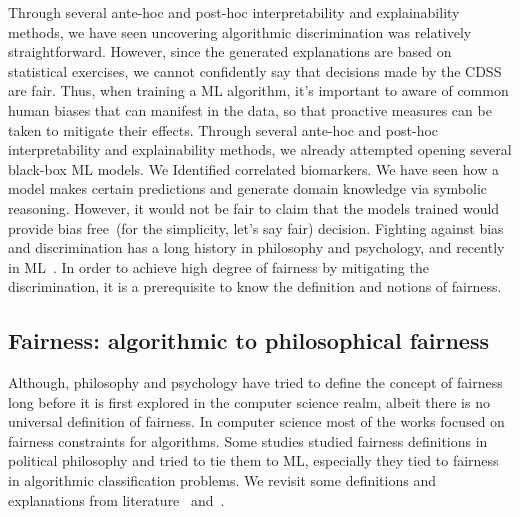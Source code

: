 \hspace*{3.5mm} Through several ante-hoc and post-hoc interpretability and explainability methods, we have seen uncovering algorithmic discrimination was relatively straightforward. However, since the generated explanations are based on statistical exercises, we cannot confidently say that decisions made by the CDSS are fair. Thus, when training a ML algorithm, it's important to aware of common human biases that can manifest in the data, so that proactive measures can be taken to mitigate their effects. %
Through several ante-hoc and post-hoc interpretability and explainability methods, we already attempted opening several black-box ML models. We Identified correlated biomarkers. We have seen how a model makes certain predictions and generate domain knowledge via symbolic reasoning. However, it would not be fair to claim that the models trained would provide bias free~(for the simplicity, let's say fair) decision. Fighting against bias and discrimination has a long history in philosophy and psychology, and recently in ML~\cite{fairness_survey}. In order to achieve high degree of fairness by mitigating the discrimination, it is a prerequisite to know the definition and notions of fairness. 


\iffalse
\subsection{Fairness: algorithmic to philosophical fairness}
Although, philosophy and psychology have tried to define the concept of fairness long before it is first explored in the computer science realm, albeit there is no universal definition of fairness. In computer science most of the works focused on fairness constraints for algorithms. Some studies studied fairness definitions in political philosophy and tried to tie them to ML, especially they tied to fairness in algorithmic classification problems. We revisit some definitions and explanations from literature~\cite{fairness_survey} and~\cite{verma2018fairness}.

